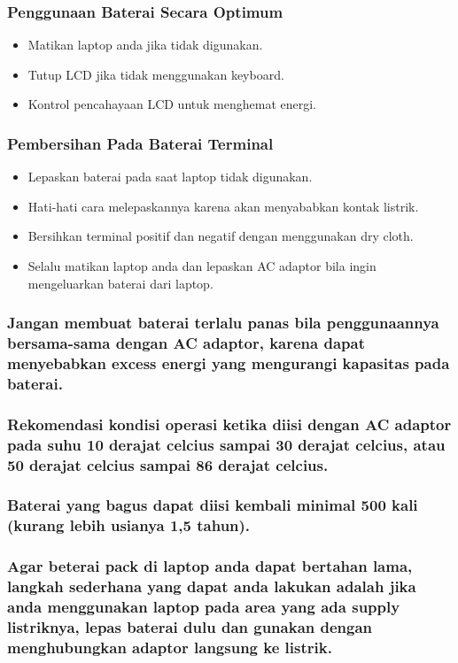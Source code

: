 	\subsubsection{Penggunaan Baterai Secara Optimum}
	\begin{itemize}	
		\item Matikan laptop anda jika tidak digunakan.
		\item Tutup LCD jika tidak menggunakan keyboard.
		\item Kontrol pencahayaan LCD untuk menghemat energi.
	\end{itemize}	
	\subsubsection{Pembersihan Pada Baterai Terminal}
	\begin{itemize}	
		\item Lepaskan baterai pada saat laptop tidak digunakan.
		\item Hati-hati cara melepaskannya karena akan menyababkan kontak listrik.
		\item Bersihkan terminal positif dan negatif dengan menggunakan dry cloth.
		\item Selalu matikan laptop anda dan lepaskan AC adaptor bila ingin mengeluarkan baterai dari laptop.
	\end{itemize}
	\subsubsection{Jangan membuat baterai terlalu panas bila penggunaannya bersama-sama dengan AC adaptor, karena dapat 
	menyebabkan excess energi yang mengurangi kapasitas pada baterai.}
	\subsubsection{Rekomendasi kondisi operasi ketika diisi dengan AC adaptor pada suhu 10 derajat celcius sampai
	30 derajat celcius, atau 50 derajat celcius sampai 86 derajat celcius.}
	\subsubsection{Baterai yang bagus dapat diisi kembali minimal 500 kali (kurang lebih usianya 1,5 tahun).}
	\subsubsection{Agar beterai pack di laptop anda dapat bertahan lama, langkah sederhana yang dapat anda lakukan adalah jika
	anda menggunakan laptop pada area yang ada supply listriknya, lepas baterai dulu dan gunakan dengan menghubungkan adaptor 
	langsung ke listrik.}
	
